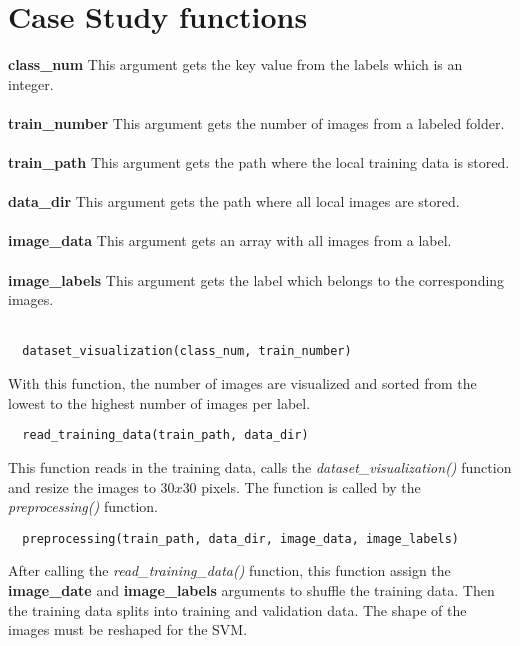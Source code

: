 \section{Case Study functions}
\label{sec:case_study_functions}

\textbf{class\_num}
This argument gets the key value from the labels which is an integer. \\ \\
\textbf{train\_number}
This argument gets the number of images from a labeled folder. \\ \\
\textbf{train\_path}
This argument gets the path where the local training data is stored. \\ \\
\textbf{data\_dir}
This argument gets the path where all local images are stored. \\ \\
\textbf{image\_data}
This argument gets an array with all images from a label. \\ \\
\textbf{image\_labels}
This argument gets the label which belongs to the corresponding images. \\ \\

\begin{lstlisting}
  dataset_visualization(class_num, train_number)
\end{lstlisting}

\noindent With this function, the number of images are visualized and sorted from the lowest to the highest number of images per label.

\begin{lstlisting}
  read_training_data(train_path, data_dir)
\end{lstlisting}

\noindent This function reads in the training data, calls the \textit{dataset\_visualization()} function and resize the images to $30x30$ pixels. The function is called by the \textit{preprocessing()} function.

\begin{lstlisting}
  preprocessing(train_path, data_dir, image_data, image_labels)
\end{lstlisting}

\noindent After calling the \textit{read\_training\_data()} function, this function assign the \textbf{image\_date} and \textbf{image\_labels} arguments to shuffle the training data. Then the training data splits into training and validation data. The shape of the images must be reshaped for the SVM.

